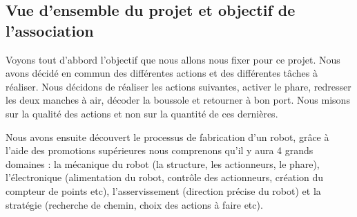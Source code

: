 \documentclass[a4paper,10pt]{article}
\begin{document}
\begin{spacing}{1.5}
\subsection{Vue d'ensemble du projet et objectif de l'association}
Voyons tout d'abbord l'objectif que nous allons nous fixer pour ce projet. Nous
avons décidé en commun des différentes actions et des différentes tâches à
réaliser. Nous décidons de réaliser les actions suivantes, activer le phare,
redresser les deux manches à air, décoder la boussole et retourner à bon port.
Nous misons sur la qualité des actions et non sur la quantité de ces
dernières.

Nous avons ensuite découvert le processus de fabrication d'un robot, grâce
à l'aide des promotions supérieures nous comprenons qu'il y aura 4 grands
domaines :  la mécanique du robot (la structure, les actionneurs, le phare),
l'électronique (alimentation du robot,
contrôle des actionneurs, création du compteur de points etc), l'asservissement (direction
précise du robot) et la stratégie (recherche de chemin, choix des actions à
faire etc).

\end{spacing}
\end{document}
